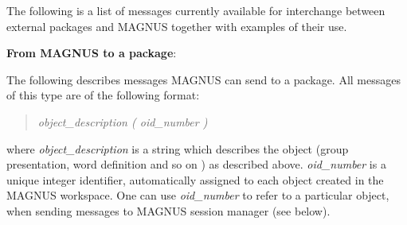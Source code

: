 \documentclass[12pt]{article}
\def\magnus{MAGNUS }
\begin{document}
The following is a list of messages currently available for
interchange between external packages and \magnus together with examples of
their use.

\textbf{From \magnus to a package}:

The following describes messages \magnus can send to a package.
All messages of this type are of the following format:
\begin{quote}\em
object\_description ( oid\_number )
\end{quote}
where {\em object\_description} is a string which describes the
object (group presentation, word definition and so on ) as
described above. {\em oid\_number} is a unique integer
identifier, automatically assigned to each object created in the
\magnus workspace. One can use {\em oid\_number} to
refer to a particular object, when sending messages to \magnus
session manager (see below).
\end{document}
